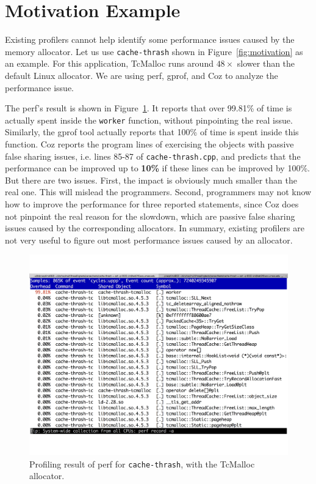 \section{Motivation Example}
\label{sec:motivation}

 Existing profilers cannot help identify some performance issues caused by the memory allocator. Let us use \texttt{cache-thrash} shown in Figure~\ref{fig:motivation} as an example. For this application, TcMalloc runs around $48\times$ slower than the default Linux allocator. We are using perf, gprof, and Coz to analyze the performance issue. 
 
 The perf's result is shown in Figure~\ref{fig:mot1}. It reports that over 99.81\% of time is actually spent inside the \texttt{worker} function, without pinpointing the real issue. Similarly, the gprof tool actually reports that 100\% of time is spent inside this function. Coz reports the program lines of exercising the objects with passive false sharing issues, i.e. lines 85-87 of \texttt{cache-thrash.cpp}, and predicts that the performance can be improved up to \textbf{10\%} if these lines can be improved by 100\%. But there are two issues. First, the impact is obviously much smaller than the real one. This will mislead the programmers. Second, programmers may not know how to improve the performance for three reported statements, since Coz does not pinpoint the real reason for the slowdown, which are passive false sharing issues caused by the corresponding allocators. In summary, existing profilers are not very useful to figure out most performance issues caused by an allocator.   


\begin{figure}[!ht]
\centering
\includegraphics[width=0.9\columnwidth]{figures/perf-cache-thrash-tcmalloc}
\caption{Profiling result of perf for \texttt{cache-thrash}, with the TcMalloc allocator. \label{fig:mot1}}
\end{figure}

